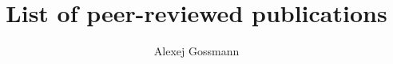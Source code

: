 \documentclass[12pt]{article}
\title{List of peer-reviewed publications}
\author{Alexej Gossmann}
\begin{document}
\maketitle

\renewcommand\refname{Bibliography}

\nocite{*}

\end{document}
